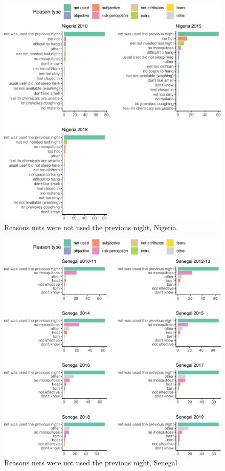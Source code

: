 \documentclass[review,
3p]{elsarticle} %
\begin{document}
\begin{figure}

{\centering \includegraphics[width=1\linewidth]{reasons_paper_files/figure-latex/ng_reas-1} 

}

\caption{\label{ng_reas}Reasons nets were not used the previous night, Nigeria}\label{fig:ng_reas}
\end{figure}

\begin{figure}

{\centering \includegraphics[width=1\linewidth]{reasons_paper_files/figure-latex/sn_reas-1} 

}

\caption{\label{sn_reas}Reasons nets were not used the previous night, Senegal}\label{fig:sn_reas}
\end{figure}
\end{document}
